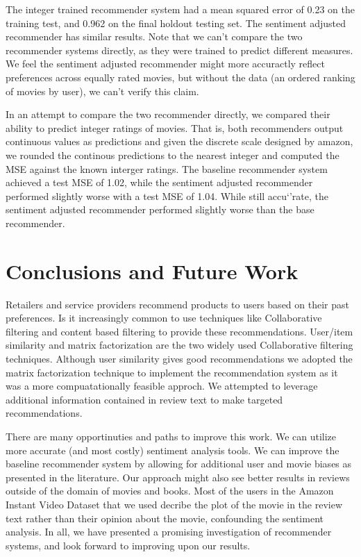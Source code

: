 \documentclass{article} %
\begin{document}
The integer trained recommender system had a mean squared error of 0.23 on the training test, and 0.962 on the final holdout testing set. The sentiment adjusted recommender has similar results. Note that we can't compare the two recommender systems directly, as they were trained to predict different measures. We feel the sentiment adjusted recommender might more accuractly reflect preferences across equally rated movies, but without the data (an ordered ranking of movies by user), we can't verify this claim. 

In an attempt to compare the two recommender directly, we compared their ability to predict integer ratings of movies. That is, both recommenders output continuous values as predictions and given the discrete scale designed by amazon, we rounded the continous predictions to the nearest integer and computed the MSE against the known interger ratings. The baseline recommender system achieved a test MSE of 1.02, while the sentiment adjusted recommender performed slightly worse with a test MSE of 1.04. While still accu`'rate, the sentiment adjusted recommender performed slightly worse than the base recommender. 


\section{Conclusions and Future Work}
Retailers and service providers recommend products to users based on their past preferences. Is it increasingly common to use techniques like Collaborative filtering and content based filtering to provide these recommendations. User/item similarity and matrix factorization are the two widely used Collaborative filtering techniques. Although user similarity gives good recommendations we adopted the matrix factorization technique to implement the recommendation system as it was a more compuatationally feasible approch. We attempted to leverage additional information contained in review text to make targeted recommendations. 

There are many opportinuties and paths to improve this work. We can utilize more accurate (and most costly) sentiment analysis tools. We can improve the baseline recommender system by allowing for additional user and movie biases as presented in the literature. Our approach might also see better results in reviews outside of the domain of movies and books. Most of the users in the Amazon Instant Video Dataset that we used decribe the plot of the movie in the review text rather than their opinion about the movie, confounding the sentiment analysis. In all, we have presented a promising investigation of recommender systems, and look forward to improving upon our results. 


	
\end{document}
